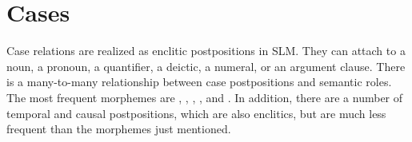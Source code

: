 \section{Cases}
Case relations are realized as enclitic postpositions in SLM. They can attach to a noun, a pronoun, a quantifier, a deictic, a numeral, or an argument clause. There is a many-to-many relationship between case postpositions and semantic roles. The most frequent morphemes are 
,
,
,
, and
. 
In addition, there are a number of temporal and causal postpositions, which are also enclitics, but are much less frequent than the morphemes just mentioned. 


% 


